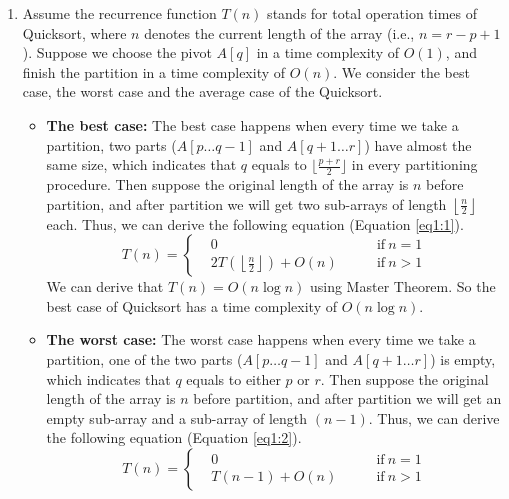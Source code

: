 \documentclass[12pt,a4paper]{article}
\makeatletter
\newtheorem*{solution}{Solution}
\theoremstyle{definition}
\renewenvironment{solution}[1][Solution] {\par\pushQED{\qed}\normalfont\topsep6\p@\@plus6\p@\relax\trivlist\item[\hskip\labelsep\bfseries#1\@addpunct{.}]\ignorespaces}{\popQED\endtrivlist\@endpefalse} \makeatother
\makeatother
\begin{document}
\begin{enumerate}
    \begin{solution}
    Assume the recurrence function $T(n)$ stands for total operation times of Quicksort, where $n$ denotes the current length of the array (i.e., $n = r - p + 1$). Suppose we choose the pivot $A[q]$ in a time complexity of $O(1)$, and finish the partition in a time complexity of $O(n)$. We consider the best case, the worst case and the average case of the Quicksort.
    \begin{itemize}
    \item \textbf{The best case:} The best case happens when every time we take a partition, two parts ($A[p \ldots q-1]$ and $A[q+1 \ldots r]$) have almost the same size, which indicates that $q$ equals to $\lfloor \frac{p + r}{2} \rfloor$ in every partitioning procedure. Then suppose the original length of the array is $n$ before partition, and after partition we will get two sub-arrays of length $\left\lfloor \frac{n}{2} \right\rfloor$ each. Thus, we can derive the following equation (Equation \eqref{eq1:1}).
        \begin{equation}
          T(n) = \left\{
          \begin{aligned}
          & 0 & \quad \quad \mathrm{if\ } n = 1 \\
          & 2 T\left(\left\lfloor \frac{n}{2} \right\rfloor \right) + O(n) & \quad \quad \mathrm{if\ } n > 1
          \end{aligned}
          \right.
          \label{eq1:1}
        \end{equation}
        We can derive that $T(n) = O(n\log{n})$ using Master Theorem. So the best case of Quicksort has a time complexity of $O(n\log{n})$.
    \item \textbf{The worst case:} The worst case happens when every time we take a partition, one of the two parts ($A[p \ldots q-1]$ and $A[q+1 \ldots r]$) is empty, which indicates that $q$ equals to either $p$ or $r$. Then suppose the original length of the array is $n$ before partition, and after partition we will get an empty sub-array and a sub-array of length $(n - 1)$. Thus, we can derive the following equation (Equation \eqref{eq1:2}).
        \begin{equation}
          T(n) = \left\{
          \begin{aligned}
          & 0 & \quad \quad \mathrm{if\ } n = 1 \\
          & T(n - 1) + O(n) & \quad \quad \mathrm{if\ } n > 1
          \end{aligned}
          \right.
          \label{eq1:2}

\end{equation}
\end{itemize}
\end{solution}
\end{enumerate}
\end{document}

